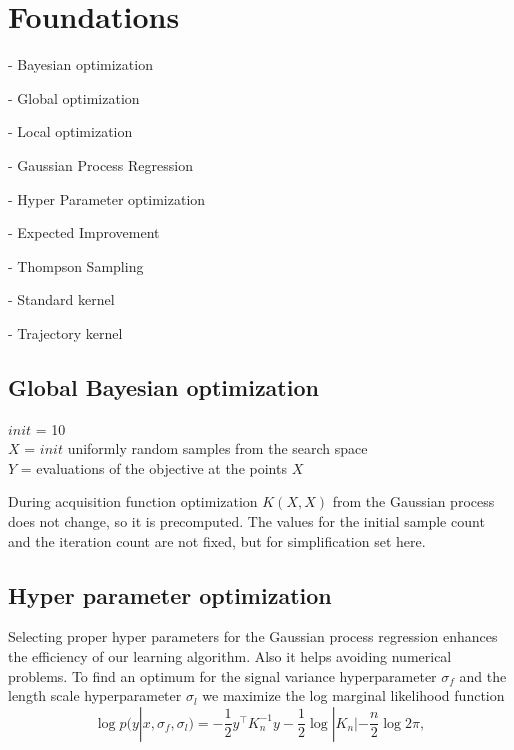 \chapter{Foundations}
\label{chap:2}
%

- Bayesian optimization

- Global optimization

- Local optimization

- Gaussian Process Regression

- Hyper Parameter optimization

- Expected Improvement

- Thompson Sampling

- Standard kernel

- Trajectory kernel

\section{Global Bayesian optimization}

\begin{algorithm}
    $init$ = 10\\
    $X$ = $init$ uniformly random samples from the search space\\
    $Y$ = evaluations of the objective at the points $X$\\
\end{algorithm}

During acquisition function optimization $K(X,X)$ from the Gaussian process does not change, so it is precomputed. The values for the initial sample count and the iteration count are not fixed, but for simplification set here.



\section{Hyper parameter optimization}
Selecting proper hyper parameters for the Gaussian process regression enhances the efficiency of our learning algorithm. Also it helps avoiding numerical problems. To find an optimum for the signal variance hyperparameter $\sigma_f$ and the length scale hyperparameter $\sigma_l$ we maximize the log marginal likelihood function
\begin{equation} \label{eq:hypOpt}
    \log p(y|x,\sigma_f,\sigma_l) = -\frac{1}{2} y^\top K_n^{-1} y -\frac{1}{2} \log |K_n| -\frac{n}{2}\log 2\pi ,
\end{equation}

